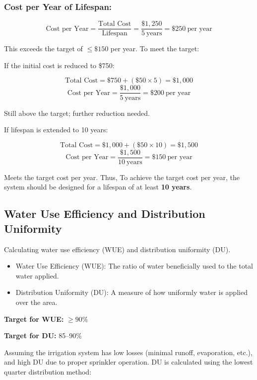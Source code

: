 \documentclass[12pt]{report}
\begin{document}
\subsubsection{Cost per Year of Lifespan:}

\[
\text{Cost per Year} = \frac{\text{Total Cost}}{\text{Lifespan}} = \frac{\$1,250}{5\ \text{years}} = \$250\ \text{per year}
\]

\noindent This exceeds the target of \(\leq\$150\) per year. To meet the target:

\noindent If the initial cost is reduced to \$750:

\[
\text{Total Cost} = \$750 + (\$50 \times 5) = \$1,000
\]
\[
\text{Cost per Year} = \frac{\$1,000}{5\ \text{years}} = \$200\ \text{per year}
\]

Still above the target; further reduction needed.

\noindent If lifespan is extended to 10 years:

\[
\text{Total Cost} = \$1,000 + (\$50 \times 10) = \$1,500
\]
\[
\text{Cost per Year} = \frac{\$1,500}{10\ \text{years}} = \$150\ \text{per year}
\]

Meets the target cost per year. Thus, To achieve the target cost per year, the system should be designed for a lifespan of at least \textbf{10 years}.

\subsection{Water Use Efficiency and Distribution Uniformity}

Calculating water use efficiency (WUE) and distribution uniformity (DU).

\begin{itemize}
    \item Water Use Efficiency (WUE): The ratio of water beneficially used to the total water applied.
\item Distribution Uniformity (DU): A measure of how uniformly water is applied over the area.
\end{itemize}

\noindent
\textbf{Target for WUE:} \(\geq90\%\)

\noindent
\textbf{Target for DU:} 85–90\%

\noindent

Assuming the irrigation system has low losses (minimal runoff, evaporation, etc.), and high DU due to proper sprinkler operation. DU is calculated using the lowest quarter distribution method:
\end{document}
